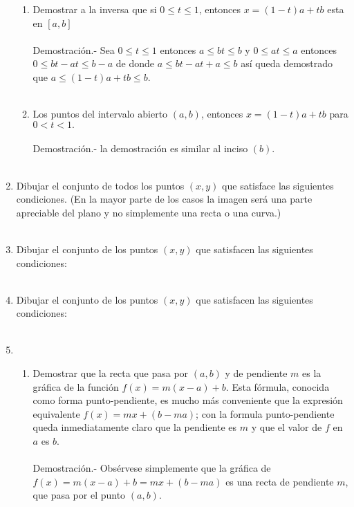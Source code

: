\begin{enumerate}
\begin{enumerate}[\bfseries (a)]
	\item Demostrar a la inversa que si $0\leq t \leq 1$, entonces $x=(1-t)a+tb$ esta en $[a,b]$\\\\
	    Demostración.-\; Sea $0\leq t \leq 1$ entonces $a\leq bt\leq b$ y $0\leq at\leq a$ entonces $0\leq bt-at\leq b-a$ de donde $a\leq bt-at+a \leq b$ así queda demostrado que $a\leq (1-t)a + tb \leq b$.\\\\

	\item Los puntos del intervalo abierto $(a,b)$, entonces $x=(1-t)a + tb$ para $0<t<1.$\\\\
	    Demostración.-\; la demostración es similar al inciso $(b)$.\\\\

    \end{enumerate}
    
    \item Dibujar el conjunto de todos los puntos $(x,y)$ que satisface las siguientes condiciones. (En la mayor parte de los casos la imagen será una parte apreciable del plano y no simplemente una recta o una curva.)\\\\

    \item Dibujar el conjunto de los puntos $(x,y)$ que satisfacen las siguientes condiciones:\\\\

    \item Dibujar el conjunto de los puntos $(x,y)$ que satisfacen las siguientes condiciones:\\\\

    \item 
    \begin{enumerate}[\bfseries (a)]
	
	\item Demostrar que la recta que pasa por $(a,b)$ y de pendiente $m$ es la gráfica de la función $f(x)=m(x-a)+b.$ Esta fórmula, conocida como forma punto-pendiente, es mucho más conveniente que la expresión equivalente $f(x)=mx+(b-ma)$; con la formula punto-pendiente queda inmediatamente claro que la pendiente es $m$ y que el valor de $f$ en $a$ es $b$.\\\\
	    Demostración.-\; Obsérvese simplemente que la gráfica de $f(x)=m(x-a)+b=mx+(b-ma)$ es una recta de pendiente $m$, que pasa por el punto $(a,b)$.\\\\


\end{enumerate}
\end{enumerate}
